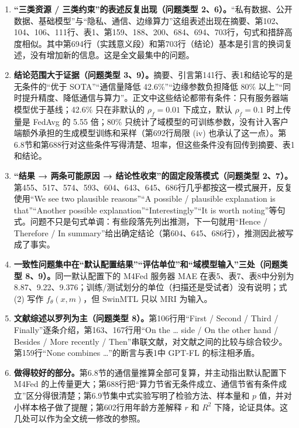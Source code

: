 \documentclass[11pt,a4paper]{ctexart}
\begin{document}
\begin{enumerate}[leftmargin=*]
\item \textbf{“三类资源 / 三类约束”的表述反复出现（问题类型 2、6）。}“私有数据、公开数据、基础模型”与“隐私、通信、边缘算力”这组表述出现在摘要、第102、104、106、111行、表1、第159、188、200、684、694、703行，句式和措辞高度相似。其中第694行（实践意义段）和第703行（结论）基本是引言的换词复述，没有增加新的信息。这是全文最集中的问题。
\item \textbf{结论范围大于证据（问题类型 3、9）。}摘要、引言第141行、表1和结论写的是无条件的“优于 SOTA”“通信量降低 42.6\%”“边缘参数负担降低 80\% 以上”“同时提升精度、降低通信与算力”。正文中这些结论都带有条件：只有服务器端模型优于基线；42.6\% 只在非默认的 $\rho_f=0.01$ 下成立，默认 $\rho_f=0.1$ 时上传量是 FedAvg 的 5.55 倍；80\% 只统计了域模型的可训练参数，没有计入客户端额外承担的生成模型训练和采样（第692行局限 (iv) 也承认了这一点）。第6.8节和第688行对这些条件写得清楚、坦率，但这些条件没有回传到摘要、表1和结论。
\item \textbf{“结果 → 两条可能原因 → 结论性收束”的固定段落模式（问题类型 2、7）。}第455、517、574、593、604、643、645、686行几乎都按这一模式展开，反复使用“We see two plausible reasons”“A possible / plausible explanation is that”“Another possible explanation”“Interestingly”“It is worth noting”等句式。问题不只是句式单调：有些段落先列出推测，下一句就用“Hence / Therefore / In summary”给出确定结论（第604、645、686行），推测因此被写成了事实。
\item \textbf{一致性问题集中在“默认配置结果”“评估单位”和“域模型输入”三处（问题类型 8、9）。}同一默认配置下的 M4Fed 服务器 MAE 在表5、表7、表8中分别为 8.87、9.22、9.376；训练/测试划分的单位（扫描还是受试者）没有说明；式 (2) 写作 $f_\theta(x,m)$，但 SwinMTL 只以 MRI 为输入。
\item \textbf{文献综述以罗列为主（问题类型 8）。}第106行用“First / Second / Third / Finally”逐条介绍，第163、167行用“On the … side / On the other hand / Besides / More recently / Then”串联文献，对文献之间的比较与综合较少。第159行“None combines …”的断言与表1中 GPT-FL 的标注相矛盾。
\item \textbf{做得较好的部分。}第6.8节的通信量推算全部可复算，并主动指出默认配置下 M4Fed 的上传量更大；第688行把“算力节省无条件成立、通信节省有条件成立”区分得很清楚；第6.9节集中式实验写明了检验方法、样本量和 $p$ 值，并对小样本格子做了提醒；第602行用年龄方差解释 $r$ 和 $R^2$ 下降，论证具体。这几处可以作为全文统一修改的参照。
\end{enumerate}
\end{document}
